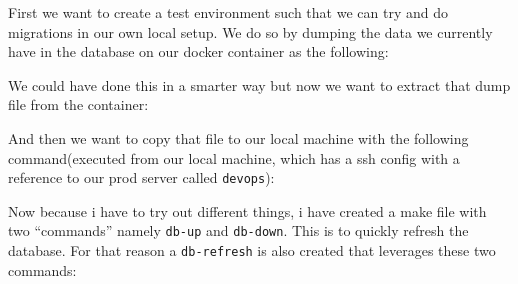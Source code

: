 First we want to create a test environment such that we can try and do migrations in our own local setup. We do so by dumping the data we currently have in the database on our docker container as the following:


We could have done this in a smarter way but now we want to extract that dump file from the container:


And then we want to copy that file to our local machine with the following command(executed from our local machine, which has a ssh config with a reference to our prod server called \texttt{devops}):


Now because i have to try out different things, i have created a make file with two ``commands'' namely \texttt{db-up} and \texttt{db-down}. This is to quickly refresh the database. For that reason a \texttt{db-refresh} is also created that leverages these two commands:


